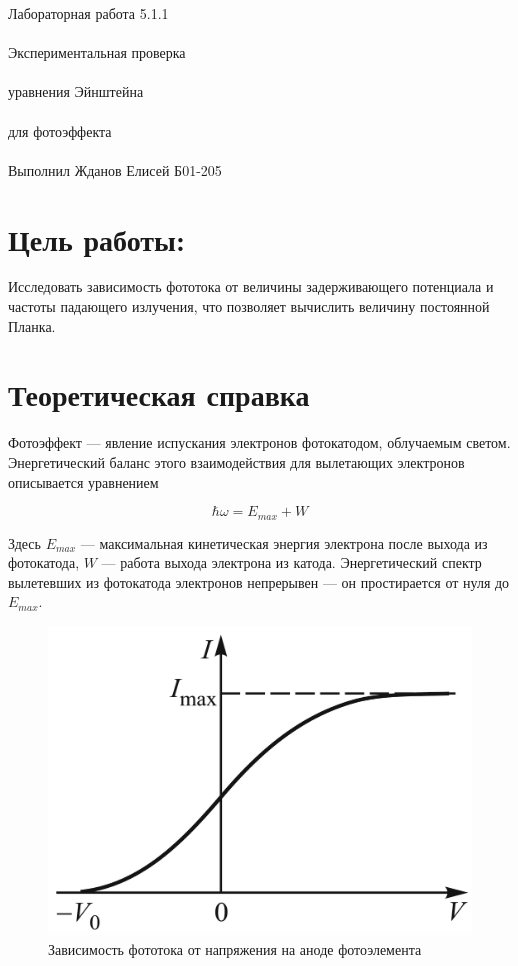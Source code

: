 \documentclass{astroedu-lab}
\begin{document}
\pagestyle{plain}

\begin{problem}{\huge Лабораторная работа 5.1.1\\\\Экспериментальная проверка\\\\ уравнения Эйнштейна\\\\
для фотоэффекта\\\\Выполнил Жданов Елисей Б01-205}

\section{Цель работы:}

Исследовать зависимость фототока от величины задерживающего потенциала и частоты падающего излучения, что позволяет вычислить величину постоянной Планка.
	

\section{Теоретическая справка}

Фотоэффект --- явление испускания электронов фотокатодом, облучаемым светом. Энергетический баланс этого взаимодействия для вылетающих электронов описывается уравнением
	
	\begin{equation}\label{energy balance}
	\hbar \omega = E_{max} + W
	\end{equation}
	

	
	Здесь $ E_{max} $ ---  максимальная кинетическая энергия электрона после выхода из фотокатода, $ W $ --- работа выхода электрона из катода. Энергетический спектр вылетевших из фотокатода электронов непрерывен --- он простирается от нуля до $ E_{max} $. 
	
	\begin{figure}[!h]
	\centering
	\includegraphics[width=0.3\linewidth]{I(V)}
	\caption{Зависимость фототока от напряжения на аноде фотоэлемента}
	\label{ris I(V)}
\end{figure}
	

\end{problem}
\end{document}
